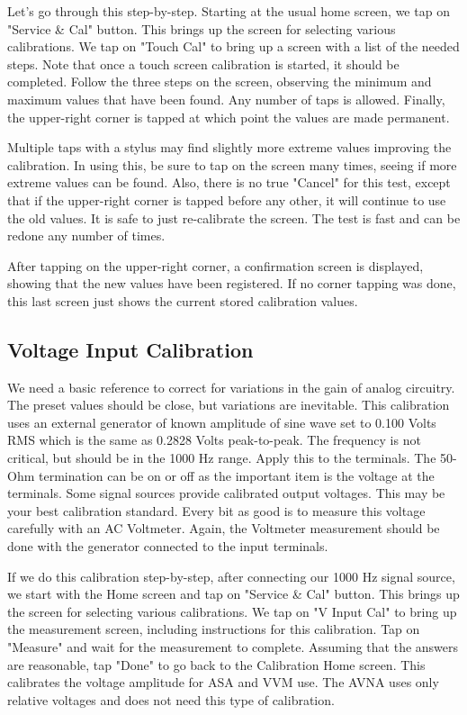 Let's go through this step-by-step.  Starting at the usual home screen, we tap on "\textsf{Service \& Cal}" button. This brings up the screen for selecting various calibrations.  We tap on "\textsf{Touch Cal}" to bring up a screen with a list of the needed steps. Note that once a touch screen calibration is started, it should be completed.  Follow  the three steps on the screen, observing the minimum and maximum values that have been found.  Any number of taps is allowed.  Finally,  the upper-right corner is tapped at which point the values are made permanent. 

Multiple taps with a stylus may find slightly more extreme values improving the calibration.   In using this, be sure to tap on the screen many times, seeing if more extreme values can be found.  Also, there is no true "Cancel" for this test, except that if the upper-right corner is tapped before any  other, it will continue to use the old values.  It is safe to just re-calibrate the screen.  The test is fast and can be redone any number of times. 

After tapping on the upper-right corner, a confirmation screen is displayed, showing that the new values have been registered.  If no corner tapping was done, this last screen just shows the current stored calibration values.

\subsection{Voltage Input Calibration} We need a basic reference to correct for variations in the gain of analog circuitry.  The preset values should be close, but variations are inevitable.  This calibration uses an external generator of known amplitude of sine wave set to 0.100 Volts RMS which is the same as 0.2828 Volts peak-to-peak. The frequency is not critical, but should be in the 1000 Hz range.  Apply this to the  terminals.  The 50-Ohm termination can be on or off as the important item is the voltage at the terminals.  Some signal sources provide calibrated output voltages.  This may be your best calibration standard.  Every bit as good is to measure this voltage carefully with an AC Voltmeter.  Again, the Voltmeter measurement should be done with the generator connected to the  input terminals.

If we do this calibration step-by-step, after connecting our 1000 Hz signal source,  we start with the Home screen and tap on "\textsf{Service \& Cal}" button. This brings up the screen for selecting various calibrations.  We tap on "\textsf{V Input Cal}" to bring up the measurement screen, including instructions for this calibration.  Tap on "\textsf{Measure}" and wait for the measurement to complete.  Assuming that the answers are reasonable, tap "\textsf{Done}" to go back to the Calibration Home screen.  This calibrates the voltage amplitude for ASA and VVM use.  The AVNA uses only relative voltages and does not need this type of calibration.

